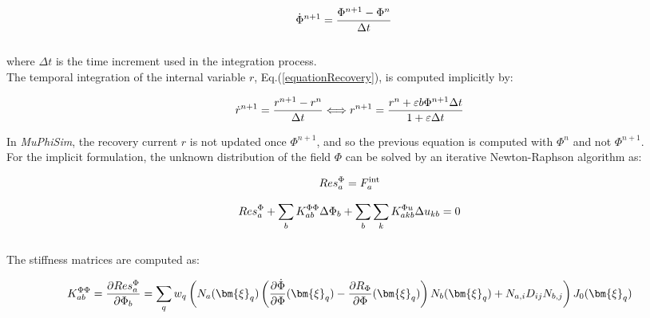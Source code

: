 \documentclass[oneside,11pt,times]{book}
\begin{document}
\begin{equation}
\begin{aligned}
\centering
\dot{\Phi}^{n+1}&=\dfrac{\Phi^{n+1} - \Phi^{n}}{\Delta t}
\end{aligned}
\label{equationPhitime}
\end{equation}
\\
where $\Delta t$ is the time increment used in the integration process.\\

The temporal integration of the internal variable $r$, Eq.(\ref{equationRecovery}), is computed implicitly by:

\begin{equation}
\begin{aligned}
\centering
\dot{r}^{n+1}=\frac{r^{n+1}-r^{n}}{\Delta t} \Longleftrightarrow   r^{n+1}=\dfrac{r^{n}+\varepsilon b \Phi^{n+1} \Delta t}{1+\varepsilon \Delta t}
\end{aligned}
\label{equationrtime}
\end{equation}

In \textit{MuPhiSim}, the recovery current $r$ is not updated once $\Phi^{n+1}$, and so the previous equation is computed with $\Phi^n$ and not $\Phi^{n+1}$. \\

For the implicit formulation, the unknown distribution of the field $\Phi$ can be solved by an iterative Newton-Raphson algorithm as:

\begin{equation}
\begin{aligned}
\centering
Res^{\Phi}_{a} = {F}^{\text{int}}_a
\end{aligned}
\label{equationResPhiElem}
\end{equation}

\begin{equation}
\begin{aligned}
\centering
Res^{\Phi}_a + \sum_b K_{ab}^{\Phi\Phi}\Delta\Phi_b +\sum_b \sum_k K_{akb}^{\Phi u}\Delta{u_{kb}}=0
\end{aligned}
\label{equationN-R}
\end{equation}
\\
The stiffness matrices are computed as:

\begin{equation}
\begin{aligned}
\centering
K_{ab}^{\Phi\Phi} = \dfrac{\partial{Res^{\Phi}_{a}}}{\partial{\Phi_b}} = \sum_q w_q \left( N_a(\bm{\xi}_q) \left( \dfrac{\partial{\dot{\Phi}}}{\partial{\Phi}}(\bm{\xi}_q) - \dfrac{\partial{R_{\Phi}}}{\partial{\Phi}}(\bm{\xi}_q) \right) N_b(\bm{\xi}_q) + N_{a,i} D_{ij} N_{b,j} \right) J_0(\bm{\xi}_q)
\end{aligned}
\label{equationKphiphi}
\end{equation}
\end{document}
